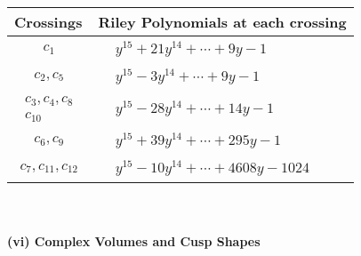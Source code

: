 \documentclass[1p]{elsarticle_modified}
\theoremstyle{definition}
\begin{document}
\begin{tabular}{m{50pt}|m{274pt}}
Crossings & \hspace{64pt}Riley Polynomials at each crossing \\
\hline $$\begin{aligned}c_{1}\end{aligned}$$&$\begin{aligned}
&y^{15}+21 y^{14}+\cdots+9 y-1
\end{aligned}$\\
\hline $$\begin{aligned}c_{2},c_{5}\end{aligned}$$&$\begin{aligned}
&y^{15}-3 y^{14}+\cdots+9 y-1
\end{aligned}$\\
\hline $$\begin{aligned}c_{3},c_{4},c_{8}\\c_{10}\end{aligned}$$&$\begin{aligned}
&y^{15}-28 y^{14}+\cdots+14 y-1
\end{aligned}$\\
\hline $$\begin{aligned}c_{6},c_{9}\end{aligned}$$&$\begin{aligned}
&y^{15}+39 y^{14}+\cdots+295 y-1
\end{aligned}$\\
\hline $$\begin{aligned}c_{7},c_{11},c_{12}\end{aligned}$$&$\begin{aligned}
&y^{15}-10 y^{14}+\cdots+4608 y-1024
\end{aligned}$\\
\hline
\end{tabular}\\~\\
\newpage\flushleft \textbf{(vi) Complex Volumes and Cusp Shapes}
\end{document}
